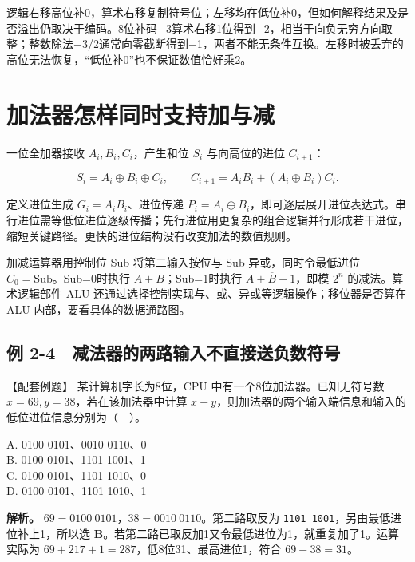 逻辑右移高位补0，算术右移复制符号位；左移均在低位补0，但如何解释结果及是否溢出仍取决于编码。8位补码\ensuremath{-}3算术右移1位得到\ensuremath{-}2，相当于向负无穷方向取整；整数除法\ensuremath{-}3/2通常向零截断得到\ensuremath{-}1，两者不能无条件互换。左移时被丢弃的高位无法恢复，``低位补0''也不保证数值恰好乘2。

\section{加法器怎样同时支持加与减}\label{CO02-09}

一位全加器接收 \(A_i,B_i,C_i\)，产生和位 \(S_i\) 与向高位的进位 \(C_{i+1}\)：

\[
S_i=A_i\oplus B_i\oplus C_i,
\qquad C_{i+1}=A_iB_i+(A_i\oplus B_i)C_i.
\]

定义进位生成 \(G_i=A_iB_i\)、进位传递 \(P_i=A_i\oplus B_i\)，即可逐层展开进位表达式。串行进位需等低位进位逐级传播；先行进位用更复杂的组合逻辑并行形成若干进位，缩短关键路径。更快的进位结构没有改变加法的数值规则。

加减运算器用控制位 Sub 将第二输入按位与 Sub 异或，同时令最低进位 \(C_0=\mathrm{Sub}\)。Sub=0时执行 \(A+B\)；Sub=1时执行 \(A+\overline B+1\)，即模 \(2^n\) 的减法。算术逻辑部件 ALU 还通过选择控制实现与、或、异或等逻辑操作；移位器是否算在 ALU 内部，要看具体的数据通路图。

\subsection{例 2-4　减法器的两路输入不直接送负数符号}\label{CO02-10}

\begin{example}[配套例题]

【配套例题】 某计算机字长为8位，CPU 中有一个8位加法器。已知无符号数 \(x=69,y=38\)，若在该加法器中计算 \(x-y\)，则加法器的两个输入端信息和输入的低位进位信息分别为（　）。

A. 0100 0101、0010 0110、0\\
B. 0100 0101、1101 1001、1\\
C. 0100 0101、1101 1010、0\\
D. 0100 0101、1101 1010、1

\end{example}

\textbf{解析。} \(69=0100\ 0101\)，\(38=0010\ 0110\)。第二路取反为 \texttt{1101 1001}，另由最低进位补上1，所以选 \textbf{B}。若第二路已取反加1又令最低进位为1，就重复加了1。运算实际为 \(69+217+1=287\)，低8位31、最高进位1，符合 \(69-38=31\)。

